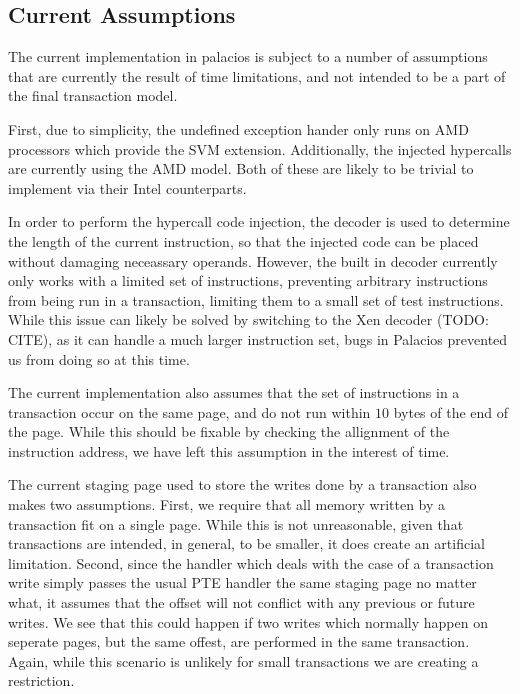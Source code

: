 \documentclass{acm_proc_article-sp}
\begin{document}
\subsection{Current Assumptions}

The current implementation in palacios is subject to a number of assumptions
that are currently the result of time limitations, and not intended to be a
part of the final transaction model.

First, due to simplicity, the undefined exception hander only runs on AMD 
processors which provide the SVM extension. Additionally, the injected 
hypercalls are currently using the AMD model. Both of these are likely to be
trivial to implement via their Intel counterparts.  

In order to perform the hypercall code injection, the decoder is used to 
determine the length of the current instruction, so that the injected code
can be placed without damaging neceassary operands. However, the built in
decoder currently only works with a limited set of instructions, preventing
arbitrary instructions from being run in a transaction, limiting them to a 
small set of test instructions. While this issue can likely be solved by 
switching to the Xen decoder (TODO: CITE), as it can handle a much larger
instruction set, bugs in Palacios prevented us from doing so at this time.

The current implementation also assumes that the set of instructions in a 
transaction occur on the same page, and do not run within $10$ bytes of the
end of the page. While this should be fixable by checking the allignment of
the instruction address, we have left this assumption in the interest of 
time. 

The current staging page used to store the writes done by a transaction also
makes two assumptions. First, we require that all memory written by a 
transaction fit on a single page. While this is not unreasonable, given that
transactions are intended, in general, to be smaller, it does create an
artificial limitation. Second, since the handler which deals with the case
of a transaction write simply passes the usual PTE handler the same staging
page no matter what, it assumes that the offset will not conflict with any
previous or future writes. We see that this could happen if two writes which
normally happen on seperate pages, but the same offest, are performed in the
same transaction. Again, while this scenario is unlikely for small transactions
we are creating a restriction.
 
\end{document}
